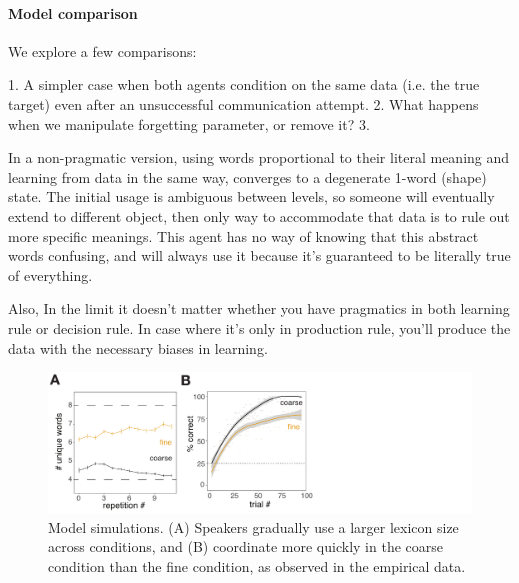 \paragraph{Model comparison}

We explore a few comparisons:

1. A simpler case when both agents condition on the same data (i.e. the true target) even after an unsuccessful communication attempt. 
2. What happens when we manipulate forgetting parameter, or remove it?
3. 

In a non-pragmatic version, using words proportional to their literal meaning and learning from data in the same way, converges to a degenerate 1-word (shape) state.
The initial usage is ambiguous between levels, so someone will eventually extend to different object, then only way to accommodate that data is to rule out more specific meanings. 
This agent has no way of knowing that this abstract words confusing, and will always use it because it's guaranteed to be literally true of everything.


Also, In the limit it doesn't matter whether you have pragmatics in both learning rule or decision rule. In case where it's only in production rule, you'll produce the data with the necessary biases in learning.

\begin{figure}[t]
\begin{center}
\includegraphics[scale=0.6]{./figures/sec2-modelFig.pdf}
\vspace{-1ex}
{\caption{{Model simulations. (A) Speakers gradually use a larger lexicon size across conditions, and (B) coordinate more quickly in the coarse condition than the fine condition, as observed in the empirical data.}  \label{fig:sec2model}}}
\end{center}
\vspace{-3ex}
\end{figure}

